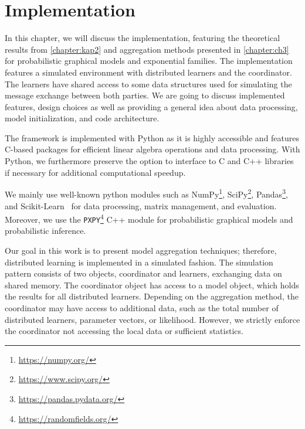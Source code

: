 
\chapter{Implementation}
\label{chapter:ch4}
In this chapter, we will discuss the implementation, featuring the theoretical results from \autoref{chapter:kap2} and aggregation methods presented in \autoref{chapter:ch3} for probabilistic graphical models and exponential families.
The implementation features a simulated environment with distributed learners and the coordinator.
The learners have shared access to some data structures used for simulating the message exchange between both parties.
We are going to discuss implemented features, design choices as well as providing a general idea about data processing, model initialization, and code architecture.

The framework is implemented with Python as it is highly accessible and features C-based packages for efficient linear algebra operations and data processing.
With Python, we furthermore preserve the option to interface to C and C++ libraries if necessary for additional computational speedup.


We mainly use well-known python modules such as NumPy\footnote[1]{\hypersetup{pdfborder=1 1 1}\href{https://numpy.org/}{https://numpy.org/}\hypersetup{hidelinks}}, SciPy\footnote[2]{\hypersetup{pdfborder=1 1 1}\href{https://www.scipy.org/}{https://www.scipy.org/}\hypersetup{hidelinks}}, Pandas\footnote[3]{\hypersetup{pdfborder=1 1 1}\href{https://pandas.pydata.org/}{https://pandas.pydata.org/}\hypersetup{hidelinks}}, and Scikit-Learn~\cite{scikit-learn} for data processing, matrix management, and evaluation.
Moreover, we use the \texttt{PXPY}\footnote[4]{\hypersetup{pdfborder=1 1 1}\href{https://randomfields.org/}{https://randomfields.org/}\hypersetup{hidelinks}} C++ module for probabilistic graphical models and probabilistic inference.

Our goal in this work is to present model aggregation techniques; therefore, distributed learning is implemented in a simulated fashion.
The simulation pattern consists of two objects, coordinator and learners, exchanging data on shared memory. 
The coordinator object has access to a model object, which holds the results for all distributed learners.
Depending on the aggregation method, the coordinator may have access to additional data, such as the total number of distributed learners, parameter vectors, or likelihood. 
However, we strictly enforce the coordinator not accessing the local data or sufficient statistics.

